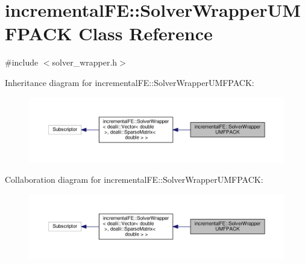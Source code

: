 \hypertarget{classincremental_f_e_1_1_solver_wrapper_u_m_f_p_a_c_k}{}\section{incremental\+FE\+:\+:Solver\+Wrapper\+U\+M\+F\+P\+A\+CK Class Reference}
\label{classincremental_f_e_1_1_solver_wrapper_u_m_f_p_a_c_k}


{\ttfamily \#include $<$solver\+\_\+wrapper.\+h$>$}



Inheritance diagram for incremental\+FE\+:\+:Solver\+Wrapper\+U\+M\+F\+P\+A\+CK\+:\nopagebreak
\begin{figure}[H]
\begin{center}
\leavevmode
\includegraphics[width=350pt]{classincremental_f_e_1_1_solver_wrapper_u_m_f_p_a_c_k__inherit__graph}
\end{center}
\end{figure}


Collaboration diagram for incremental\+FE\+:\+:Solver\+Wrapper\+U\+M\+F\+P\+A\+CK\+:\nopagebreak
\begin{figure}[H]
\begin{center}
\leavevmode
\includegraphics[width=350pt]{classincremental_f_e_1_1_solver_wrapper_u_m_f_p_a_c_k__coll__graph}
\end{center}
\end{figure}
